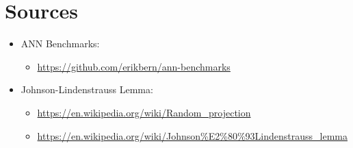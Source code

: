 \documentclass[12pt]{report}
\begin{document}
\section{Sources}
\begin{itemize}
    \item ANN Benchmarks: \begin{itemize}
        \item \url{https://github.com/erikbern/ann-benchmarks}
    \end{itemize}
    \item Johnson-Lindenstrauss Lemma: \begin{itemize}
        \item \url{https://en.wikipedia.org/wiki/Random_projection}
        \item \url{https://en.wikipedia.org/wiki/Johnson%E2%80%93Lindenstrauss_lemma}
    \end{itemize}
\end{itemize}
\end{document}
